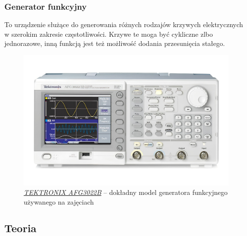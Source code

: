 \documentclass{article}
\begin{document}
      \subsubsection{Generator funkcyjny}
        To urządzenie służące do generowania różnych rodzajów krzywych elektrycznych w szerokim zakresie częstotliwości. Krzywe te moga być cykliczne zlbo jednorazowe, inną funkcją jest też możliwość dodania przesunięcia stałego.

        \begin{figure}[!ht]
          \begin{center}
              \includegraphics[scale=0.075]{grafiki/00291.jpg}
              \caption{\textit{\href{https://www.amazon.in/Skyking-Tektronix-AFG3022B-Arbitrary-Generator/dp/B001JJXG0C}{TEKTRONIX AFG3022B}} -- dokładny model generatora funkcyjnego używanego na zajęciach}
          \end{center}
        \end{figure}

  \fancyfoot[C]{\thepage}
  \pagebreak
  \addtolength{\footskip}{-1cm} %
  \fancyfoot[C]{\quad \\ \thepage}

  \subsection{Teoria}
\end{document}
